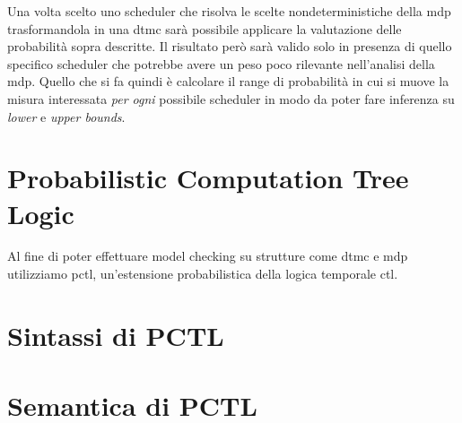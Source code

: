 Una volta scelto uno scheduler che risolva le scelte nondeterministiche della \ac{mdp} trasformandola in una \ac{dtmc} sarà possibile applicare la valutazione delle probabilità sopra descritte. Il risultato però sarà valido solo in presenza di quello specifico scheduler che potrebbe avere un peso poco rilevante nell'analisi della \ac{mdp}. Quello che si fa quindi è calcolare il range di probabilità in cui si muove la misura interessata \emph{per ogni} possibile scheduler in modo da poter fare inferenza su \emph{lower} e \emph{upper bounds}.

\section{Probabilistic Computation Tree Logic}
Al fine di poter effettuare model checking su strutture come \ac{dtmc} e \ac{mdp} utilizziamo \ac{pctl}, un'estensione probabilistica della logica temporale \ac{ctl}.

\section{Sintassi di PCTL}


\section{Semantica di PCTL}
